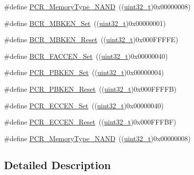 \begin{DoxyCompactItemize}
\#define \hyperlink{group___f_s_m_c___private___defines_gaf3992efb285ab994c41463af5107c501}{P\+C\+R\+\_\+\+Memory\+Type\+\_\+\+N\+A\+ND}~((\hyperlink{_p_e___types_8h_a33594304e786b158f3fb30289278f5af}{uint32\+\_\+t})0x00000008)
\item 
\#define \hyperlink{group___f_s_m_c___private___defines_ga3c427afcf32b17fb72be67fd4638e6d5}{B\+C\+R\+\_\+\+M\+B\+K\+E\+N\+\_\+\+Set}~((\hyperlink{_p_e___types_8h_a33594304e786b158f3fb30289278f5af}{uint32\+\_\+t})0x00000001)
\item 
\#define \hyperlink{group___f_s_m_c___private___defines_gaa63b72d32a32c53a057ee0a45bed0d3b}{B\+C\+R\+\_\+\+M\+B\+K\+E\+N\+\_\+\+Reset}~((\hyperlink{_p_e___types_8h_a33594304e786b158f3fb30289278f5af}{uint32\+\_\+t})0x000\+F\+F\+F\+F\+E)
\item 
\#define \hyperlink{group___f_s_m_c___private___defines_ga38da33a73789b2c932962d75dfc1341f}{B\+C\+R\+\_\+\+F\+A\+C\+C\+E\+N\+\_\+\+Set}~((\hyperlink{_p_e___types_8h_a33594304e786b158f3fb30289278f5af}{uint32\+\_\+t})0x00000040)
\item 
\#define \hyperlink{group___f_s_m_c___private___defines_gade871050f882b7f48582084b0e95f67c}{P\+C\+R\+\_\+\+P\+B\+K\+E\+N\+\_\+\+Set}~((\hyperlink{_p_e___types_8h_a33594304e786b158f3fb30289278f5af}{uint32\+\_\+t})0x00000004)
\item 
\#define \hyperlink{group___f_s_m_c___private___defines_gac6d0ddc3888a0554b032f0f484cfe332}{P\+C\+R\+\_\+\+P\+B\+K\+E\+N\+\_\+\+Reset}~((\hyperlink{_p_e___types_8h_a33594304e786b158f3fb30289278f5af}{uint32\+\_\+t})0x000\+F\+F\+F\+F\+B)
\item 
\#define \hyperlink{group___f_s_m_c___private___defines_ga8a0d7950936e3869b449d421e03a19ac}{P\+C\+R\+\_\+\+E\+C\+C\+E\+N\+\_\+\+Set}~((\hyperlink{_p_e___types_8h_a33594304e786b158f3fb30289278f5af}{uint32\+\_\+t})0x00000040)
\item 
\#define \hyperlink{group___f_s_m_c___private___defines_gaca1a5c5cd46c8a32dab58c3eb3b865fa}{P\+C\+R\+\_\+\+E\+C\+C\+E\+N\+\_\+\+Reset}~((\hyperlink{_p_e___types_8h_a33594304e786b158f3fb30289278f5af}{uint32\+\_\+t})0x000\+F\+F\+F\+B\+F)
\item 
\#define \hyperlink{group___f_s_m_c___private___defines_gaf3992efb285ab994c41463af5107c501}{P\+C\+R\+\_\+\+Memory\+Type\+\_\+\+N\+A\+ND}~((\hyperlink{_p_e___types_8h_a33594304e786b158f3fb30289278f5af}{uint32\+\_\+t})0x00000008)
\end{DoxyCompactItemize}


\subsection{Detailed Description}


